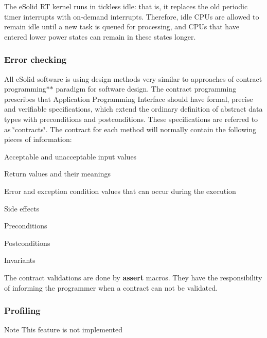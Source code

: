 The e\-Solid R\-T kernel runs in tickless idle\-: that is, it replaces the old periodic timer interrupts with on-\/demand interrupts. Therefore, idle C\-P\-Us are allowed to remain idle until a new task is queued for processing, and C\-P\-Us that have entered lower power states can remain in these states longer.\hypertarget{index_spec_errchk}{}\subsubsection{Error checking}\label{index_spec_errchk}
All e\-Solid software is using design methods very similar to approaches of contract programming$\ast$$\ast$ paradigm for software design. The contract programming prescribes that Application Programming Interface should have formal, precise and verifiable specifications, which extend the ordinary definition of abstract data types with preconditions and postconditions. These specifications are referred to as \char`\"{}contracts\char`\"{}. The contract for each method will normally contain the following pieces of information\-:


\begin{DoxyItemize}
\item Acceptable and unacceptable input values
\item Return values and their meanings
\item Error and exception condition values that can occur during the execution
\item Side effects
\item Preconditions
\item Postconditions
\item Invariants
\end{DoxyItemize}

The contract validations are done by {\bfseries assert} macros. They have the responsibility of informing the programmer when a contract can not be validated.\hypertarget{index_spec_prof}{}\subsubsection{Profiling}\label{index_spec_prof}
\begin{DoxyNote}{Note}
This feature is not implemented 
\end{DoxyNote}
